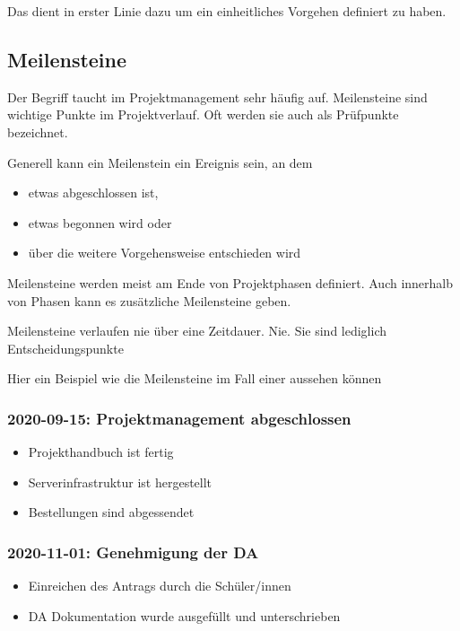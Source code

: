 \documentclass[
    headings=optiontotocandhead,%
    twoside,
    numbers=noenddot,%
    12pt, %
    titlepage, %
    parskip=full, %
    listof=leveldown, 
    numbers=noenddot, %
    a4paper,DIV=14,
    BCOR=15mm,
]{scrbook}
\providecommand{\tightlist}{%
  \setlength{\itemsep}{0pt}\setlength{\parskip}{0pt}}
\begin{document}
Das dient in erster Linie dazu um ein einheitliches Vorgehen definiert
zu haben.

\hypertarget{meilensteine}{%
\subsection{Meilensteine}\label{meilensteine}}

Der Begriff taucht im Projektmanagement sehr häufig auf. Meilensteine
sind wichtige Punkte im Projektverlauf. Oft werden sie auch als
Prüfpunkte bezeichnet.

Generell kann ein Meilenstein ein Ereignis sein, an dem

\begin{itemize}
\tightlist
\item
  etwas abgeschlossen ist,
\item
  etwas begonnen wird oder
\item
  über die weitere Vorgehensweise entschieden wird
\end{itemize}

Meilensteine werden meist am Ende von Projektphasen definiert. Auch
innerhalb von Phasen kann es zusätzliche Meilensteine geben.

Meilensteine verlaufen nie über eine Zeitdauer. Nie. Sie sind lediglich
Entscheidungspunkte

Hier ein Beispiel wie die Meilensteine im Fall einer aussehen können

\hypertarget{projektmanagement-abgeschlossen}{%
\subsubsection{2020-09-15: Projektmanagement
abgeschlossen}\label{projektmanagement-abgeschlossen}}

\begin{itemize}
\tightlist
\item
  Projekthandbuch ist fertig
\item
  Serverinfrastruktur ist hergestellt
\item
  Bestellungen sind abgessendet
\end{itemize}

\hypertarget{genehmigung-der-da}{%
\subsubsection{2020-11-01: Genehmigung der
DA}\label{genehmigung-der-da}}

\begin{itemize}
\tightlist
\item
  Einreichen des Antrags durch die Schüler/innen
\item
  DA Dokumentation wurde ausgefüllt und unterschrieben
\end{itemize}
\end{document}
